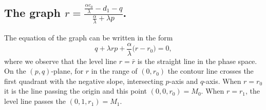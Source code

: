 \documentclass[a4paper,11pt]{article}
\begin{document}
%
%
%
%
%
%
%
%
%
%
%
%
%
%
%
%
%
%
%
%
%

\subsection*{The graph $\displaystyle r=\frac{ \frac{\alpha c_0}{\lambda} - d_1 -q }{ \frac{\alpha}{\lambda} + \lambda p}$.}
The equation of the graph can be written in the form
\begin{equation}
 q + \lambda {r}p + \frac{\alpha}{\lambda} \Big( r-r_0\Big)=0, \label{eq:level}
\end{equation}
where we observe that the level line $r=\bar{r}$ is the straight line in the phase space. On the $(p,q)$-plane, for $r$ in the range of $(0,r_0)$ the contour line crosses the first quadrant with the negative slope, intersecting $p$-axis and $q$-axis. When $r=r_0$ it is the line passing the origin and this point $(0,0,r_0) = M_0$. When $r=r_1$, the level line passes the $(0,1,r_1)=M_1$.
\end{document}
